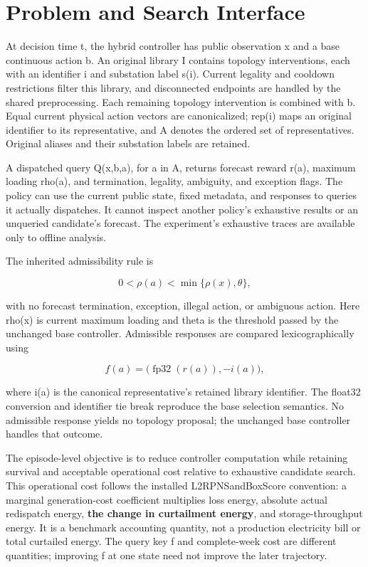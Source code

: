 \documentclass[letterpaper]{article}
\begin{document}
\section{Problem and Search Interface}

At decision time t, the hybrid controller has public observation x and a base continuous action b. An original library I contains topology interventions, each with an identifier i and substation label s(i). Current legality and cooldown restrictions filter this library, and disconnected endpoints are handled by the shared preprocessing. Each remaining topology intervention is combined with b. Equal current physical action vectors are canonicalized; rep(i) maps an original identifier to its representative, and A denotes the ordered set of representatives. Original aliases and their substation labels are retained.


A dispatched query Q(x,b,a), for a in A, returns forecast reward r(a), maximum loading rho(a), and termination, legality, ambiguity, and exception flags. The policy can use the current public state, fixed metadata, and responses to queries it actually dispatches. It cannot inspect another policy's exhaustive results or an unqueried candidate's forecast. The experiment's exhaustive traces are available only to offline analysis.


The inherited admissibility rule is


\begin{equation}
0 < \rho(a) < \min\{\rho(x),\theta\},
\end{equation}

with no forecast termination, exception, illegal action, or ambiguous action. Here rho(x) is current maximum loading and theta is the threshold passed by the unchanged base controller. Admissible responses are compared lexicographically using


\begin{equation}
f(a)=\bigl(\operatorname{fp32}(r(a)),-i(a)\bigr),
\end{equation}

where i(a) is the canonical representative's retained library identifier. The float32 conversion and identifier tie break reproduce the base selection semantics. No admissible response yields no topology proposal; the unchanged base controller handles that outcome.


The episode-level objective is to reduce controller computation while retaining survival and acceptable operational cost relative to exhaustive candidate search. This operational cost follows the installed L2RPNSandBoxScore convention: a marginal generation-cost coefficient multiplies loss energy, absolute actual redispatch energy, \textbf{the change in curtailment energy}, and storage-throughput energy. It is a benchmark accounting quantity, not a production electricity bill or total curtailed energy. The query key f and complete-week cost are different quantities; improving f at one state need not improve the later trajectory.
\end{document}
